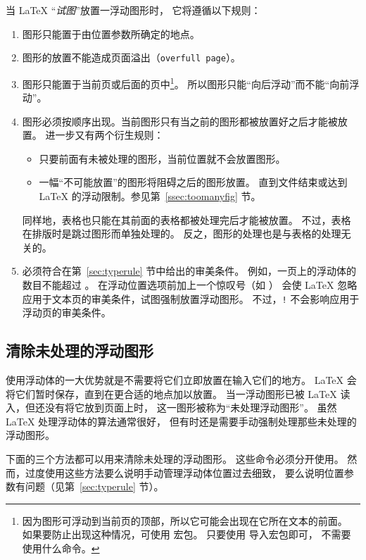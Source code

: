 当 \LaTeX{} “\emph{试图}”放置一浮动图形时，
它将遵循以下规则：
\begin{enumerate}
	\item 图形只能置于由位置参数所确定的地点。
	\item 图形的放置不能造成页面溢出（\texttt{overfull page}）。
	\item 图形只能置于当前页或后面的页中\footnote{
        因为图形可浮动到当前页的顶部，所以它可能会出现在它所在文本的前面。
		如果要防止出现这种情况，可使用 宏包。
		只要使用  导入宏包即可，
		不需要使用什么命令。}。
	所以图形只能“向后浮动”而不能“向前浮动”。
	\item 图形必须按顺序出现。当前图形只有当之前的图形都被放置好之后才能被放置。
	进一步又有两个衍生规则：
	\begin{itemize}
		\item 只要前面有未被处理的图形，当前位置就不会放置图形。
		\item 一幅“不可能放置”的图形将阻碍之后的图形放置。
		直到文件结束或达到 \LaTeX{} 的浮动限制。参见第~\ref{ssec:toomanyfig} 节。
	\end{itemize}
	同样地，表格也只能在其前面的表格都被处理完后才能被放置。
	不过，表格在排版时是跳过图形而单独处理的。
	反之，图形的处理也是与表格的处理无关的。
	\item 必须符合在第~\ref{sec:typerule} 节中给出的审美条件。
	例如，一页上的浮动体的数目不能超过 。
	在浮动位置选项前加上一个惊叹号（如 \opt{[!ht]}）
	会使 \LaTeX{} 忽略应用于文本页的审美条件，试图强制放置浮动图形。
	不过，\texttt{!} 不会影响应用于浮动页的审美条件。
\end{enumerate}


\subsection{清除未处理的浮动图形}\label{ssec:unprocessfig}

使用浮动体的一大优势就是不需要将它们立即放置在输入它们的地方。
\LaTeX{} 会将它们暂时保存，直到在更合适的地点加以放置。
当一浮动图形已被 \LaTeX{} 读入，但还没有将它放到页面上时，
这一图形被称为“未处理浮动图形”。
虽然 \LaTeX{} 处理浮动体的算法通常很好，
但有时还是需要手动强制处理那些未处理的浮动图形。

下面的三个方法都可以用来清除未处理的浮动图形。
这些命令必须分开使用。
然而，过度使用这些方法要么说明手动管理浮动体位置过去细致，
要么说明位置参数有问题（见第~\ref{sec:typerule} 节）。

